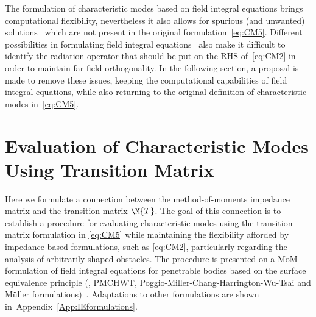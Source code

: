 \documentclass[journal]{IEEEtran}
\begin{document}
The formulation of characteristic modes based on field integral equations brings computational flexibility, nevertheless it also allows for spurious (and unwanted) solutions~\cite{Huang+etal2019} which are not present in the original formulation~\eqref{eq:CM5}. Different possibilities in formulating field integral equations~\cite{2016_Hu_TAP} also make it difficult to identify the radiation operator that should be put on the RHS of~\eqref{eq:CM2} in order to maintain far-field orthogonality. In the following section, a proposal is made to remove these issues, keeping the computational capabilities of field integral equations, while also returning to the original definition of characteristic modes in~\eqref{eq:CM5}.

\section{Evaluation of Characteristic Modes Using Transition Matrix}
\label{sec:CMfromT}

Here we formulate a connection between the method-of-moments impedance matrix and the transition matrix $\M{T}$.  The goal of this connection is to establish a procedure for evaluating characteristic modes using the transition matrix formulation in \eqref{eq:CM5} while maintaining the flexibility afforded by impedance-based formulations, such as \eqref{eq:CM2}, particularly regarding the analysis of arbitrarily shaped obstacles. The procedure is presented on a \ac{MoM} formulation of field integral equations for penetrable bodies based on the surface equivalence principle (\eg{}, PMCHWT, Poggio-Miller-Chang-Harrington-Wu-Tsai and M\"{u}ller formulations)~\cite{1973_Poggio_ComputerTechniquesForElectromagnetics,1977_Wu_RS,ChangHarrington_AsurfaceFormulationForCharacteristicModesOfMaterialBodies,Jin_TheoryAndComputationOfElectromagneticFields}. Adaptations to other formulations are shown in~Appendix~\ref{App:IEformulations}. 
\end{document}
